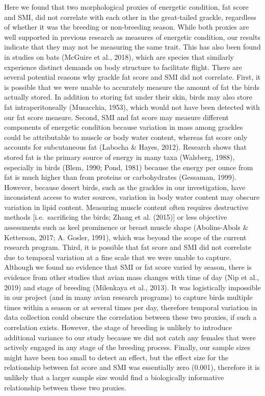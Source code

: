 \documentclass[
]{article}
\begin{document}
Here we found that two morphological proxies of energetic condition, fat
score and SMI, did not correlate with each other in the great-tailed
grackle, regardless of whether it was the breeding or non-breeding
season. While both proxies are well supported in previous research as
measures of energetic condition, our results indicate that they may not
be measuring the same trait. This has also been found in studies on bats
(McGuire et al., 2018), which are species that similarly experience
distinct demands on body structure to facilitate flight. There are
several potential reasons why grackle fat score and SMI did not
correlate. First, it is possible that we were unable to accurately
measure the amount of fat the birds actually stored. In addition to
storing fat under their skin, birds may also store fat intraperitoneally
(Musacchia, 1953), which would not have been detected with our fat score
measure. Second, SMI and fat score may measure different components of
energetic condition because variation in mass among grackles could be
attributable to muscle or body water content, whereas fat score only
accounts for subcutaneous fat (Labocha \& Hayes, 2012). Research shows
that stored fat is the primary source of energy in many taxa (Walsberg,
1988), especially in birds (Blem, 1990; Pond, 1981) because the energy
per ounce from fat is much higher than from proteins or carbohydrates
(Gessaman, 1999). However, because desert birds, such as the grackles in
our investigation, have inconsistent access to water sources, variation
in body water content may obscure variation in lipid content. Measuring
muscle content often requires destructive methods {[}i.e.~sacrificing
the birds; Zhang et al. (2015){]} or less objective assessments such as
keel prominence or breast muscle shape (Abolins-Abols \& Ketterson,
2017; A. Gosler, 1991), which was beyond the scope of the current
research program. Third, it is possible that fat score and SMI did not
correlate due to temporal variation at a fine scale that we were unable
to capture. Although we found no evidence that SMI or fat score varied
by season, there is evidence from other studies that avian mass changes
with time of day (Nip et al., 2019) and stage of breeding (Milenkaya et
al., 2013). It was logistically impossible in our project (and in many
avian research programs) to capture birds multiple times within a season
or at several times per day, therefore temporal variation in data
collection could obscure the correlation between these two proxies, if
such a correlation exists. However, the stage of breeding is unlikely to
introduce additional variance to our study because we did not catch any
females that were actively engaged in any stage of the breeding process.
Finally, our sample sizes might have been too small to detect an effect,
but the effect size for the relationship between fat score and SMI was
essentially zero (0.001), therefore it is unlikely that a larger sample
size would find a biologically informative relationship between these
two proxies.
\end{document}
